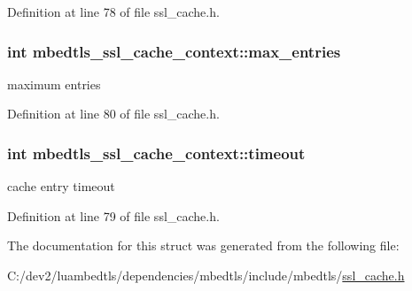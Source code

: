 Definition at line 78 of file ssl\-\_\-cache.\-h.

\hypertarget{structmbedtls__ssl__cache__context_a5a490fa803aa85541cab7808db43c477}{
\subsubsection[{max\-\_\-entries}]{\setlength{\rightskip}{0pt plus 5cm}int mbedtls\-\_\-ssl\-\_\-cache\-\_\-context\-::max\-\_\-entries}}\label{structmbedtls__ssl__cache__context_a5a490fa803aa85541cab7808db43c477}
maximum entries 

Definition at line 80 of file ssl\-\_\-cache.\-h.

\hypertarget{structmbedtls__ssl__cache__context_af5d2f556c477eb510117b4a34c02dba4}{
\subsubsection[{timeout}]{\setlength{\rightskip}{0pt plus 5cm}int mbedtls\-\_\-ssl\-\_\-cache\-\_\-context\-::timeout}}\label{structmbedtls__ssl__cache__context_af5d2f556c477eb510117b4a34c02dba4}
cache entry timeout 

Definition at line 79 of file ssl\-\_\-cache.\-h.



The documentation for this struct was generated from the following file\-:\begin{DoxyCompactItemize}
\item 
C\-:/dev2/luambedtls/dependencies/mbedtls/include/mbedtls/\hyperlink{ssl__cache_8h}{ssl\-\_\-cache.\-h}\end{DoxyCompactItemize}
